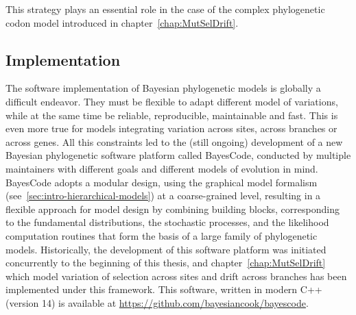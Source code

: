 This strategy plays an essential role in the case of the complex phylogenetic codon model introduced in chapter~\ref{chap:MutSelDrift}.

\subsection{Implementation}
\label{subsec:implementation}

The software implementation of Bayesian phylogenetic models is globally a difficult endeavor.
They must be flexible to adapt different model of variations, while at the same time be reliable, reproducible, maintainable and fast.
This is even more true for models integrating variation across sites, across branches or across genes.
All this constraints led to the (still ongoing) development of a new Bayesian phylogenetic software platform called BayesCode, conducted by multiple maintainers with different goals and different models of evolution in mind.
BayesCode adopts a modular design, using the graphical model formalism (see~\ref{sec:intro-hierarchical-models}) at a coarse-grained level, resulting in a flexible approach for model design by combining building blocks, corresponding to the fundamental distributions, the stochastic processes, and the likelihood computation routines that form the basis of a large family of phylogenetic models.
Historically, the development of this software platform was initiated concurrently to the beginning of this thesis, and chapter~\ref{chap:MutSelDrift} which model variation of selection across sites and drift across branches has been implemented under this framework.
This software, written in modern C++ (version 14) is available at \url{https://github.com/bayesiancook/bayescode}.